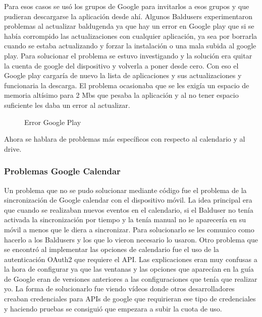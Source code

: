 Para esos casos se usó los grupos de Google para invitarlos a esos grupos y que pudieran descargarse la aplicación desde ahí.
Algunos Baldusers experimentaron problemas al actualizar baldugenda ya que hay un error en Google play que si se había corrompido las actualizaciones con cualquier aplicación, ya sea por borrarla cuando se estaba actualizando  y forzar la instalación o una mala subida al google play. 
Para solucionar el problema se estuvo investigando y la solución era quitar la cuenta de google del dispositivo y volverla a poner desde cero.
Con eso el Google play cargaría de nuevo la lista de aplicaciones y sus actualizaciones y funcionaria la descarga.
El problema ocasionaba que se les exigía un espacio de memoria altísimo para 2 Mbs que pesaba la aplicación y al no tener espacio suficiente les daba un error al actualizar.

\begin{figure}[H] 
  \begin{center} 
    \caption{Error Google Play} 
    \label{fig:ErrorGoogle} 
  \end{center} 
\end{figure}

Ahora se hablara de problemas más específicos con respecto al calendario y al drive.

\subsubsection{Problemas Google Calendar}
\label{subsubsecc:Problemas Google Calendar}

Un problema que no se pudo solucionar mediante código fue el problema de la sincronización de Google calendar con el dispositivo móvil. La idea principal era que cuando se realizaban nuevos eventos en el calendario, si el Balduser no tenía activada la sincronización por tiempo y la tenía manual no le aparecería en su móvil a menos que le diera a sincronizar.
Para solucionarlo se les comunico como hacerlo a los Baldusers y los que lo vieron necesario lo usaron.
Otro problema que se encontró al implementar las opciones de calendario fue el uso de la autenticación OAuth2 que requiere el API.
Las explicaciones eran muy confusas a la hora de configurar ya que las ventanas y las opciones que aparecían en la guía de Google eran de versiones anteriores a las configuraciones que tenía que realizar yo.
La forma de solucionarlo fue viendo vídeos donde otros desarrolladores creaban credenciales para APIs de google que requirieran ese tipo de credenciales y haciendo pruebas se consiguió que empezara a subir la cuota de uso.

